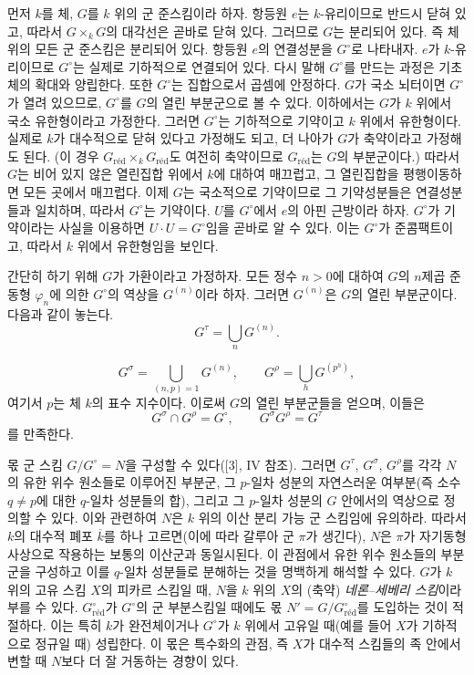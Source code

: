 
먼저 $k$를 체, $G$를 $k$ 위의 군 준스킴이라 하자. 항등원 $e$는
$k$-유리이므로 반드시 닫혀 있고, 따라서 $G\times_kG$의 대각선은 곧바로
닫혀 있다. 그러므로 $G$는 분리되어 있다. 즉 체 위의 모든 군 준스킴은
분리되어 있다. 항등원 $e$의 연결성분을 $G^\circ$로 나타내자. $e$가
$k$-유리이므로 $G^\circ$는 실제로 기하적으로 연결되어 있다. 다시 말해
$G^\circ$를 만드는 과정은 기초체의 확대와 양립한다. 또한 $G^\circ$는
집합으로서 곱셈에 안정하다. $G$가 국소 뇌터이면 $G^\circ$가 열려
있으므로, $G^\circ$를 $G$의 열린 부분군으로 볼 수 있다. 이하에서는
$G$가 $k$ 위에서 국소 유한형이라고 가정한다. 그러면 $G^\circ$는
기하적으로 기약이고 $k$ 위에서 유한형이다. 실제로 $k$가 대수적으로
닫혀 있다고 가정해도 되고, 더 나아가 $G$가 축약이라고 가정해도 된다.
(이 경우 $G_{\mathrm{réd}}\times_kG_{\mathrm{réd}}$도 여전히 축약이므로
$G_{\mathrm{réd}}$는 $G$의 부분군이다.) 따라서 $G$는 비어 있지 않은
열린집합 위에서 $k$에 대하여 매끄럽고, 그 열린집합을 평행이동하면 모든
곳에서 매끄럽다. 이제 $G$는 국소적으로 기약이므로 그 기약성분들은
연결성분들과 일치하며, 따라서 $G^\circ$는 기약이다. $U$를 $G^\circ$에서
$e$의 아핀 근방이라 하자. $G^\circ$가 기약이라는 사실을 이용하면
$U\cdot U=G^\circ$임을 곧바로 알 수 있다. 이는 $G^\circ$가
준콤팩트이고, 따라서 $k$ 위에서 유한형임을 보인다.

간단히 하기 위해 $G$가 가환이라고 가정하자. 모든 정수 $n>0$에 대하여
$G$의 $n$제곱 준동형 $\varphi_n$에 의한 $G^\circ$의 역상을
$G^{(n)}$이라 하자. 그러면 $G^{(n)}$은 $G$의 열린 부분군이다. 다음과
같이 놓는다.
\[
G^\tau=\bigcup_nG^{(n)}.
\]

\[
G^\sigma=\bigcup_{(n,p)=1}G^{(n)},
\qquad
G^\rho=\bigcup_hG^{(p^h)},
\]
여기서 $p$는 체 $k$의 표수 지수이다. 이로써 $G$의 열린 부분군들을
얻으며, 이들은
\[
G^\sigma\cap G^\rho=G^\circ,
\qquad
G^\sigma G^\rho=G^\tau
\]
를 만족한다.

 몫 군 스킴 $G/G^\circ=N$을 구성할 수 있다([3], IV 참조).
그러면 $G^\tau$, $G^\sigma$, $G^\rho$를 각각 $N$의 유한 위수 원소들로
이루어진 부분군, 그 $p$-일차 성분의 자연스러운 여부분(즉 소수
$q\neq p$에 대한 $q$-일차 성분들의 합), 그리고 그 $p$-일차 성분의
$G$ 안에서의 역상으로 정의할 수 있다. 이와 관련하여 $N$은 $k$ 위의
이산 분리 가능 군 스킴임에 유의하라. 따라서 $k$의 대수적 폐포
$\overline k$를 하나 고르면(이에 따라 갈루아 군 $\pi$가 생긴다), $N$은
$\pi$가 자기동형사상으로 작용하는 보통의 이산군과 동일시된다. 이
관점에서 유한 위수 원소들의 부분군을 구성하고 이를 $q$-일차 성분들로
분해하는 것을 명백하게 해석할 수 있다. $G$가 $k$ 위의 고유 스킴 $X$의
피카르 스킴일 때, $N$을 $k$ 위의 $X$의 (축약)
\emph{네론--세베리 스킴}이라 부를 수 있다. $G^\circ_{\mathrm{réd}}$가
$G^\circ$의 군 부분스킴일 때에도 몫
$N'=G/G^\circ_{\mathrm{réd}}$를 도입하는 것이 적절하다. 이는 특히
$k$가 완전체이거나 $G^\circ$가 $k$ 위에서 고유일 때(예를 들어 $X$가
기하적으로 정규일 때) 성립한다. 이 몫은 특수화의 관점, 즉 $X$가
대수적 스킴들의 족 안에서 변할 때 $N$보다 더 잘 거동하는 경향이 있다.

